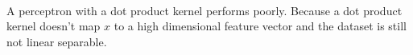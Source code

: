 \begin{answer}\\
	A perceptron with a dot product kernel performs poorly. Because a dot product kernel doesn't map $x$ to a high dimensional feature vector and the dataset is still not linear separable.
\end{answer}
